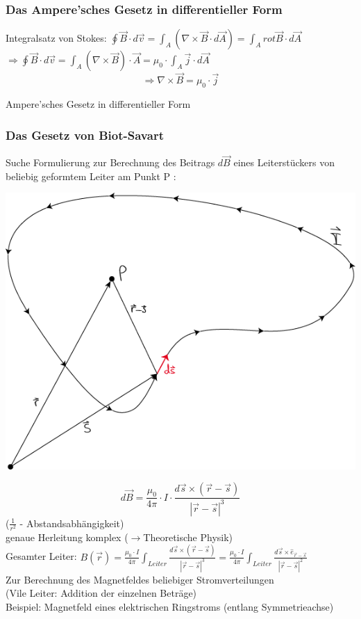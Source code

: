 \subsubsection{Das Ampere'sches Gesetz in differentieller Form}
Integralsatz von Stokes: $ {\displaystyle\oint\vec{B} \cdot d\vec{v} = \int_A (\nabla\times\vec{B} \cdot d \vec{A}) = \int_A rot\vec{B} \cdot d\vec{A}} $ \\
$ \Rightarrow {\displaystyle\oint\vec{B} \cdot d\vec{v} = \int_A (\nabla\times\vec{B}) \cdot\vec{A} = \mu_0 \cdot \int_A \vec{j} \cdot d\vec{A}} $
$$ \boxed{\Rightarrow \nabla\times\vec{B} = \mu_0 \cdot \vec{j}} $$
\begin{center}
	Ampere'sches Gesetz in differentieller Form
\end{center}

\subsubsection{Das Gesetz von Biot-Savart}
Suche Formulierung zur Berechnung des Beitrags $ d\vec{B} $ eines Leiterstückers von beliebig geformtem Leiter am Punkt P :
\begin{center}
	\includegraphics[width=0.4\linewidth]{skizzen/16/16_2B11}
\end{center}
$$ \boxed{d\vec{B} = \frac{\mu_0}{4\pi} \cdot I \cdot \frac{d\vec{s} \times (\vec{r}-\vec{s})}{|\vec{r}-\vec{s}|^3} } $$
($ \frac{1}{r^2} $ - Abstandsabhängigkeit)\\
genaue Herleitung komplex ($ \rightarrow $Theoretische Physik)\\
Gesamter Leiter: $ B(\vec{r}) = \frac{\mu_0 \cdot I}{4\pi} {\displaystyle\int_{Leiter}} \frac{d\vec{s} \times (\vec{r}-\vec{s})}{|\vec{r}-\vec{s}|^3} = \frac{\mu_0 \cdot I}{4\pi} {\displaystyle\int_{Leiter}} \frac{d\vec{s} \times \hat{e}_{\vec{r}-\vec{s}}}{|\vec{r}-\vec{s}|^2} $ \\
Zur Berechnung des Magnetfeldes beliebiger Stromverteilungen\\
(Vile Leiter: Addition der einzelnen Beträge)\\ \break
Beispiel: Magnetfeld eines elektrischen Ringstroms (entlang Symmetrieachse)
